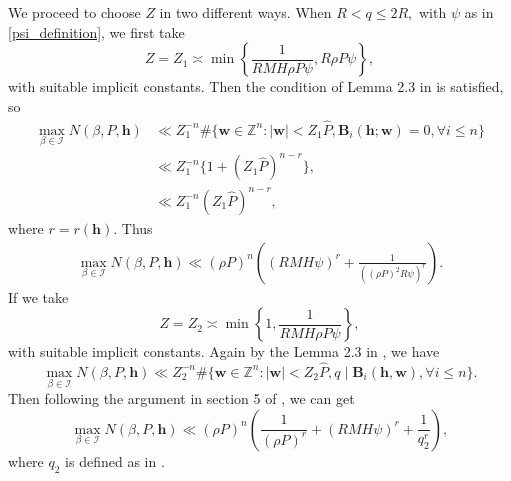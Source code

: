 \documentclass[12pt]{amsart}
\theoremstyle{definition}
\numberwithin{equation}{section}
\begin{document}
We proceed to choose $Z$ in two different ways. When $R < q \leq 2R,$ with $\psi$ as in \eqref{psi_definition}, we first take 
\begin{equation*}
    Z=Z_1\asymp \min\left\{\frac{1}{RMH \rho P \psi}, R \rho P \psi\right\},
\end{equation*}
with suitable implicit constants. Then the condition of Lemma 2.3 in \cite{heath2007cubic} is satisfied, so
\begin{equation*}
    \begin{split}
        \mathop{\max}_{\beta \in \mathcal{I}} N(\beta, P, \boldsymbol{h})
        &\ll Z_1^{-n}\#\{\boldsymbol{w}\in \mathbb{Z}^{n}:|\boldsymbol{w}|<Z_1\widehat{P}, \boldsymbol{B}_i(\boldsymbol{h};\boldsymbol{w})=0,  \forall i \leq n\}\\
        &\ll Z_1^{-n}\{1+(Z_1\widehat{P})^{n-r}\},\\
        &\ll Z_1^{-n}(Z_1\widehat{P})^{n-r},
    \end{split}
\end{equation*}
where $r=r(\boldsymbol{h}).$
Thus
\begin{equation}
    \label{from_Z_1}
    \begin{split}
        \mathop{\max}_{\beta \in \mathcal{I}} N(\beta, P, \boldsymbol{h}) 
        \ll (\rho P)^{n}\left((RMH\psi)^r+\frac{1}{\left((\rho P)^2R\psi\right)^{r}}\right).
    \end{split}
\end{equation}
If we take
\begin{equation*}
    Z=Z_2\asymp \min\left\{1, \frac{1}{RMH\rho P \psi}\right\},
\end{equation*}
with suitable implicit constants. Again by the Lemma 2.3 in \cite{heath2007cubic}, we have
\begin{equation*}
    \mathop{\max}_{\beta \in \mathcal{I}} N(\beta, P, \boldsymbol{h}) \ll Z_2^{-n}\#\{\boldsymbol{w}\in \mathbb{Z}^{n}:|\boldsymbol{w}|<Z_2\widehat{P}, q \mid \boldsymbol{B}_i(\boldsymbol{h}, \boldsymbol{w}), \forall i \leq n\}.
\end{equation*}
Then following the argument in section 5 of \cite{heath2007cubic}, we can get
\begin{equation}
    \label{from_Z_2}
    \mathop{\max}_{\beta \in \mathcal{I}} N(\beta, P, \boldsymbol{h}) \ll (\rho P)^{n}\left(\frac{1}{(\rho P)^{r}}+(RMH\psi)^r+\frac{1}{q_2^r}\right),
\end{equation}
where $q_2$ is defined as in \cite{heath2007cubic}.
\end{document}
